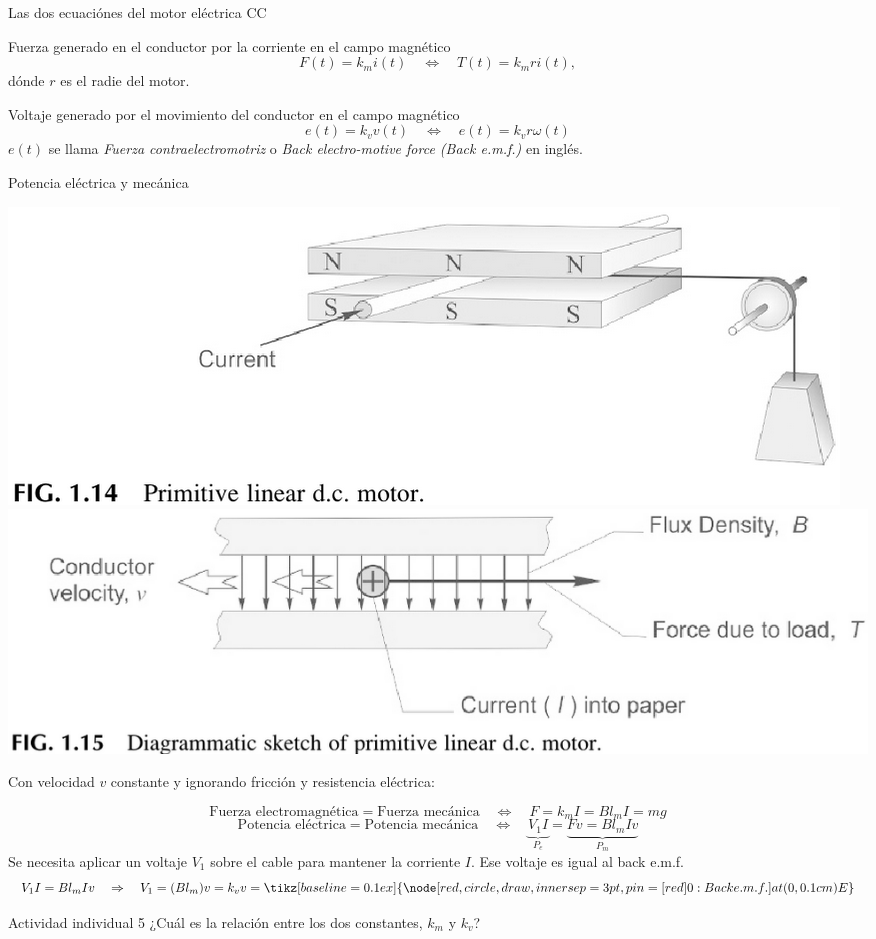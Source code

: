 \documentclass[presentation,aspectratio=169]{beamer}
\begin{document}
\begin{frame}[label={sec:org2f27d94}]{Las dos ecuaciónes del motor eléctrica CC}
\begin{block}{Fuerza generado en el conductor por la corriente en el campo magnético}
\[ F(t) = k_m i(t) \quad\Leftrightarrow\quad T(t) = k_m r i(t),\]
dónde \(r\) es el radie del motor.
\end{block}

\begin{block}{Voltaje generado por el movimiento del conductor en el campo magnético}
\[ e(t) = k_v v(t) \quad\Leftrightarrow\quad e(t) = k_v r \omega(t)\]
\(e(t)\) se llama \emph{Fuerza contraelectromotriz} o \emph{Back electro-motive force (Back e.m.f.)} en inglés.
\end{block}
\end{frame}
\begin{frame}[label={sec:org9a1ab45}]{Potencia eléctrica y mecánica}
\begin{center}
\includegraphics[width=0.4\linewidth]{../../figures/HD-fig1_14.png}
\includegraphics[width=0.53\linewidth]{../../figures/HD-fig1_15.png}
\end{center}

Con velocidad \(v\) constante y ignorando fricción y resistencia eléctrica: 

\[ \text{Fuerza electromagnética} = \text{Fuerza mecánica} \quad\Leftrightarrow\quad F=k_mI =Bl_mI = mg\]
\[ \text{Potencia eléctrica} = \text{Potencia mecánica} \quad \Leftrightarrow\quad \underbrace{V_1I}_{P_e} = \underbrace{Fv = Bl_mI v}_{P_m} \] 
Se necesita aplicar un voltaje \(V_1\) sobre el cable para mantener la corriente \(I\). \alert{Ese voltaje es igual al back e.m.f.} 
\[ V_1I = Bl_mIv \quad \Rightarrow \quad V_1 = (Bl_m)v = k_v v = \tikz[baseline = 0.1ex]{\node[red, circle, draw, inner sep=3pt, pin={[red]0:{Back e.m.f.}}] at (0, 0.1 cm) {\textcolor{black}{E}}}\]

\alert{Actividad individual 5} ¿Cuál es la relación entre los dos constantes, \(k_m\) y \(k_v\)?
\end{frame}
\end{document}
